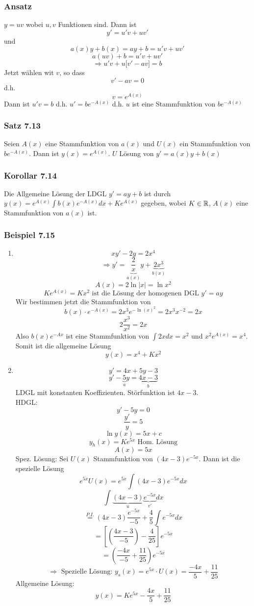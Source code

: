 \subsubsection*{Ansatz}
$y=uv$ wobei $u,v$ Funktionen sind. Dann ist \[y'=u'v+uv'\] und \[a(x)y+b(x)=ay+b=u'v+uv'\]
\[a(uv)+b=u'v+uv'\]
\[\Rightarrow u'v+u\lbrack v'-av\rbrack =b\]
Jetzt wählen wit $v$, so dass \[v'-av=0\]d.h. \[v=e^{A(x)}\] Dann ist $u'v=b$ d.h. $u'=be^{-A(x)}$ d.h. $u$ ist eine Stammfunktion von $be^{-A(x)}$

\subsubsection*{Satz 7.13}
Seien $A(x)$ eine Stammfunktion von $a(x)$ und $U(x)$ ein Stammfunktion von $be^{-A(x)}$. Dann ist $y(x)=e^{A(x)}$. $U$ Lösung von $y'=a(x)y+b(x)$

\subsubsection*{Korollar 7.14}
Die Allgemeine Lösung der LDGL $y'=ay+b$ ist durch $y(x)=e^{A(x)}\int{b(x)e^{-A(x)} dx}+Ke^{A(x)}$ gegeben, wobei $K\in\mathbb{R}$, $A(x)$ eine Stammfunktion von $a(x)$ ist.

\subsubsection*{Beispiel 7.15}
\begin{enumerate}
\item \[xy'-2y=2x^4\]
\[\Rightarrow y' = \underbrace {\frac{2}{x}}_{a(x)}y + \underbrace {2{x^3}}_{b(x)}\]
\[A(x)=2\ln\left| x \right|=\ln x^2\]
\[Ke^{A(x)}=Kx^2\text{ ist die Lösung der homogenen DGL }y'=ay\]
Wir bestimmen jetzt die Stammfunktion von \[b(x)\cdot e^{-A(x)}=2x^3e^{-\ln (x)^2}=2x^3 x^{-2}=2x\]
\[2\frac{x^3}{x^2}=2x\]
Also $b(x)e^{-Ax}$ ist eine Stammfunktion von $\int{2xdx=x^2}$ und $x^2e^{A(x)}=x^4$. Somit ist die allgemeine Lösung \[y(x)=x^4+Kx^2\]
\item \[y'=4x+5y-3\]
\[y' - \underbrace 5_ay = \underbrace {4x - 3}_b\]
LDGL mit konstanten Koeffizienten. Störfunktion ist  $4x-3$.\\

\noindent HDGL: \[y'-5y=0\]
\[\frac{y'}{y}=5\]
\[\ln y(x)=5x+c\]
\[y_h(x)=Ke^{5x} \text{ Hom. Lösung}\]
\[A(x)=5x\]
Spez. Lösung: Sei $U(x)$ Stammfunktion von $(4x-3)e^{-5x}$. Dann ist die spezielle Lösung \[e^{5x}U(x)=e^{5x}\int{(4x-3)e^{-5x}dx}\]
\[ \int {\underbrace {(4x - 3)}_u\underbrace {{e^{ - 5x}}}_{v'}dx} \]
\[\mathop = \limits^{P.I.} (4x - 3)\frac{{{e^{ - 5x}}}}{{ - 5}} + \frac{4}{5}\int {{e^{ - 5x}}dx}\]
\[ = \left[ {\left( {\frac{{4x - 3}}{{ - 5}}} \right) - \frac{4}{{25}}} \right]{e^{ - 5x}}\]
\[ = \left( {\frac{{ - 4x}}{{ - 5}} + \frac{{11}}{{25}}} \right){e^{ - 5x}}\]
\[\Rightarrow \text{ Spezielle Lösung: }y_s(x)=e^{5x}\cdot U(x)=\frac{-4x}{5}+\frac{11}{25}\]
Allgemeine Lösung: \[y(x)=Ke^{5x}-\frac{4x}{5}+\frac{11}{25}\]
\end{enumerate}

